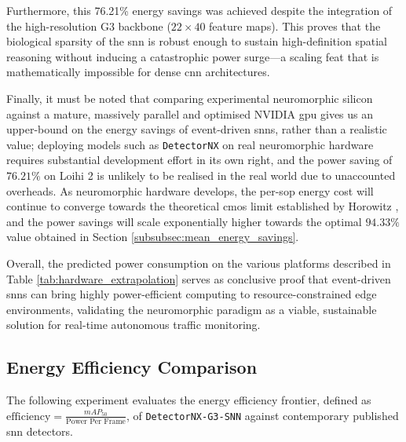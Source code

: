 Furthermore, this 76.21\% energy savings was achieved despite the integration of the high-resolution G3 backbone ($22 \times 40$ feature maps). This proves that the biological sparsity of the \gls{snn} is robust enough to sustain high-definition spatial reasoning without inducing a catastrophic power surge---a scaling feat that is mathematically impossible for dense \gls{cnn} architectures.

Finally, it must be noted that comparing experimental neuromorphic silicon against a mature, massively parallel and optimised NVIDIA \gls{gpu} gives us an upper-bound on the energy savings of event-driven \glspl{snn}, rather than a realistic value;
deploying models such as \texttt{DetectorNX} on real neuromorphic hardware requires substantial development effort in its own right, and the power saving of $76.21\%$ on Loihi 2 is unlikely to be realised in the real world due to unaccounted overheads.
As neuromorphic hardware develops, the per-\gls{sop} energy cost will continue to converge towards the theoretical \acrfull{cmos} limit established by Horowitz \cite{horowitz20141}, and the power savings will scale exponentially higher towards the optimal $94.33\%$ value obtained in Section \ref{subsubsec:mean_energy_savings}.

Overall, the predicted power consumption on the various platforms described in Table \ref{tab:hardware_extrapolation} serves as conclusive proof that event-driven \glspl{snn} can bring highly power-efficient computing to resource-constrained edge environments, validating the neuromorphic paradigm as a viable, sustainable solution for real-time autonomous traffic monitoring.

\subsection*{Energy Efficiency Comparison}
\label{subsec:efficiency_landscape}

The following experiment evaluates the energy efficiency frontier, defined as $\text{efficiency} = \frac{mAP_{50}}{\text{Power Per Frame}}$,
of \texttt{DetectorNX-G3-SNN} against contemporary published \gls{snn} detectors.

